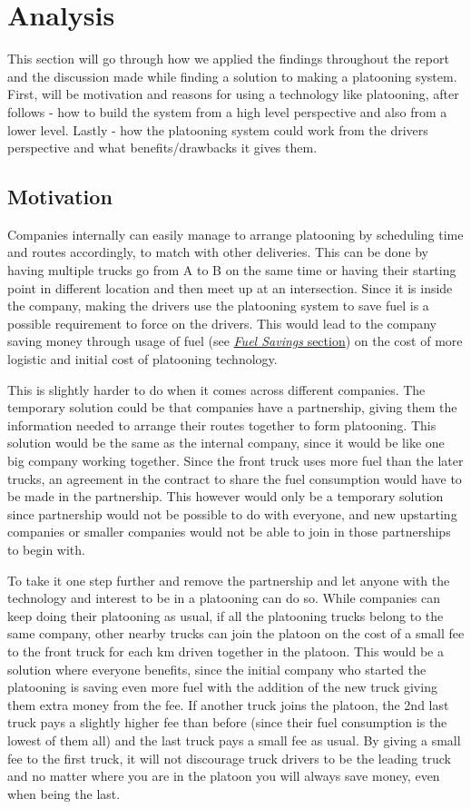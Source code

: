 \section{Analysis}\label{sec:analysis}
% 
This section will go through how we applied the findings throughout the report and the discussion made while finding a solution to making a platooning system. First, will be motivation and reasons for using a technology like platooning, after follows - how to build the system from a high level perspective and also from a lower level. Lastly - how the platooning system could work from the drivers perspective and what benefits/drawbacks it gives them.  
% 
\subsection{Motivation}
Companies internally can easily manage to arrange platooning by scheduling time and routes accordingly, to match with other deliveries. This can be done by having multiple trucks go from A to B on the same time or having their starting point in different location and then meet up at an intersection. Since it is inside the company, making the drivers use the platooning system to save fuel is a possible requirement to force on the drivers. This would lead to the company saving money through usage of fuel (see \hyperref[sec:fuel-savings]{\textit{Fuel Savings} section}) on the cost of more logistic and initial cost of platooning technology.\par
% 
This is slightly harder to do when it comes across different companies. The temporary solution could be that companies have a partnership, giving them the information needed to arrange their routes together to form platooning. This solution would be the same as the internal company, since it would be like one big company working together. Since the front truck uses more fuel than the later trucks, an agreement in the contract to share the fuel consumption would have to be made in the partnership. This however would only be a temporary solution since partnership would not be possible to do with everyone, and new upstarting companies or smaller companies would not be able to join in those partnerships to begin with.\par
% 
To take it one step further and remove the partnership and let anyone with the technology and interest to be in a platooning can do so. While companies can keep doing their platooning as usual, if all the platooning trucks belong to the same company, other nearby trucks can join the platoon on the cost of a small fee to the front truck for each km driven together in the platoon. This would be a solution where everyone benefits, since the initial company who started the platooning is saving even more fuel with the addition of the new truck giving them extra money from the fee. If another truck joins the platoon, the 2nd last truck pays a slightly higher fee than before (since their fuel consumption is the lowest of them all) and the last truck pays a small fee as usual\footnotemark. By giving a small fee to the first truck, it will not discourage truck drivers to be the leading truck and no matter where you are in the platoon you will always save money, even when being the last.

